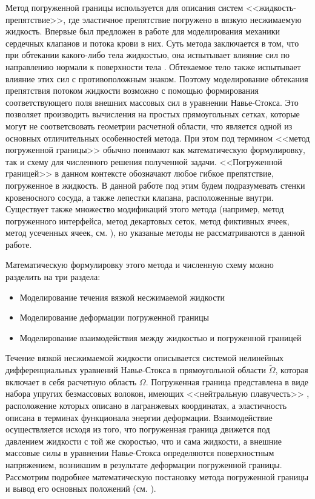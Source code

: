 Метод погруженной границы используется для описания систем
<<жидкость-препятствие>>, где эластичное препятствие погружено в вязкую
несжимаемую жидкость.  Впервые был предложен в работе \cite{peskin1972flow} для
моделирования механики сердечных клапанов и потока крови в них.  Суть метода
заключается в том, что при обтекании какого-либо тела жидкостью, она испытывает
влияние сил по направлению нормали к поверхности тела
\cite{goldstein1993modeling}.  Обтекаемое тело также испытывает влияние этих
сил с противоположным знаком.  Поэтому моделирование обтекания препятствия
потоком жидкости возможно с помощью формирования соответствующего поля внешних
массовых сил в уравнении Навье-Стокса.  Это позволяет производить вычисления на
простых прямоугольных сетках, которые могут не соответсвовать геометрии
расчетной области, что является одной из основных отличительных особенностей
метода.  При этом под термином <<метод погруженной границы>> обычно понимают
как математическую формулировку, так и схему для численного решения полученной
задачи. <<Погруженной границей>> в данном контексте обозначают любое гибкое
препятствие, погруженное в жидкость. В данной работе под этим будем
подразумевать стенки кровеносного сосуда, а также лепестки клапана,
расположенные внутри.  Существует также множество модификаций этого метода
(например, метод погруженного интерфейса, метод декартовых сеток, метод
фиктивных ячеек, метод усеченных ячеек, см. \cite{mittal2005immersed}), но
указаные методы не рассматриваются в данной работе.

Математическую формулировку этого метода и численную схему можно разделить на
три раздела:

\begin{itemize}
    \item Моделирование течения вязкой несжимаемой жидкости
    \item Моделирование деформации погруженной границы
    \item Моделирование взаимодействия между жидкостью и погруженной границей
\end{itemize}

Течение вязкой несжимаемой жидкости описывается системой нелинейных
дифференциальных уравнений Навье-Стокса в прямоугольной области
$\tilde{\Omega}$, которая включает в себя расчетную область $\Omega$.
Погруженная граница представлена в виде набора упругих безмассовых волокон,
имеющих <<нейтральную плавучесть>> \cite{griffith2012immersed}, расположение
которых описано в лагранжевых координатах, а эластичность описана в терминах
функционала энергии деформации. Взаимодействие осуществляется исходя из того,
что погруженная граница движется под давлением жидкости с той же скоростью, что
и сама жидкости, а внешние массовые силы в уравнении Навье-Стокса определяются
поверхностным напряжением, возникшим в результате деформации погруженной
границы. Рассмотрим подробнее математическую постановку метода погруженной границы
и вывод его основных положений (см. \cite{peskin2002immersed}).

